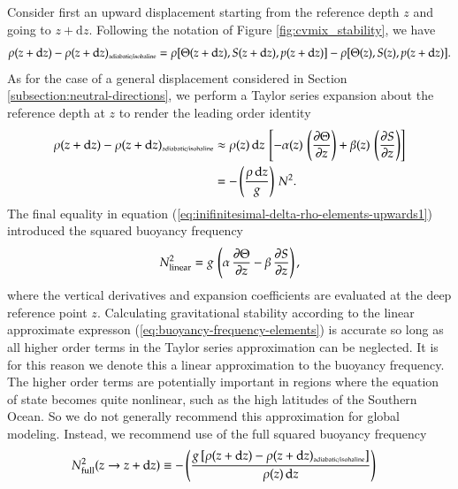 Consider first an upward displacement starting from the reference
depth $z$ and going to $z+\mathrm{d}z$.  Following the notation of
Figure \ref{fig:cvmix_stability}, we have
\begin{equation}
\rho(z+\mathrm{d} z)  - \rho(z+\mathrm{d} z)_{\mbox{\tiny adiabatic/isohaline}}  
= 
 \rho[ \Theta(z + \mathrm{d} z), S(z + \mathrm{d} z), p(z + \mathrm{d} z)]
-
\rho[ \Theta(z), S(z), p(z + \mathrm{d}z)].
\end{equation}
As for the case of a general displacement considered in Section
\ref{subsection:neutral-directions}, we perform a Taylor series
expansion about the reference depth at $z$ to render the leading order
identity
\begin{equation}
\begin{split}
\rho(z+\mathrm{d} z)  - \rho(z+\mathrm{d} z)_{\mbox{\tiny adiabatic/isohaline}}  
&\approx 
  \rho(z) \, \mathrm{d}z \, \left[ 
   -\alpha(z) \, \left( \frac{\partial \Theta}{\partial z} \right )
 + \beta(z) \, \left( \frac{\partial S}{\partial z} \right) \right]
 \\
&= 
 -\left( \frac{\rho \, \mathrm{d}z}{g} \right) \, N^{2}.
\end{split}
\label{eq:inifinitesimal-delta-rho-elements-upwards1}
\end{equation}
The final equality in equation
(\ref{eq:inifinitesimal-delta-rho-elements-upwards1}) introduced the
squared buoyancy frequency
 \begin{equation}
 N^{2}_{\mbox{\scriptsize linear}} = g \, \left( \alpha \, \frac{\partial \Theta}{\partial z} 
                         - \beta  \, \frac{\partial S}{\partial z} \right),
\label{eq:buoyancy-frequency-elements}
\end{equation}
where the vertical derivatives and expansion coefficients are
evaluated at the deep reference point $z$.  Calculating gravitational
stability according to the linear approximate expresson
(\ref{eq:buoyancy-frequency-elements}) is accurate so long as all
higher order terms in the Taylor series approximation can be
neglected.  It is for this reason we denote this a linear
approximation to the buoyancy frequency.  The higher order terms are
potentially important in regions where the equation of state becomes
quite nonlinear, such as the high latitudes of the Southern Ocean.  So
we do not generally recommend this approximation for global modeling.
Instead, we recommend use of the full squared buoyancy frequency
\begin{equation}
\begin{split}
 N^{2}_{\mbox{\scriptsize full}}(z \rightarrow z+\mathrm{d}z) &\equiv 
 -\left( \frac{g \, [ \rho(z+\mathrm{d} z)  - \rho(z+\mathrm{d} z)_{\mbox{\tiny adiabatic/isohaline}} ] } {\rho(z) \, \mathrm{d}z} \right)
\end{split}
\label{eq:inifinitesimal-delta-rho-elements-upwards2}
\end{equation}

